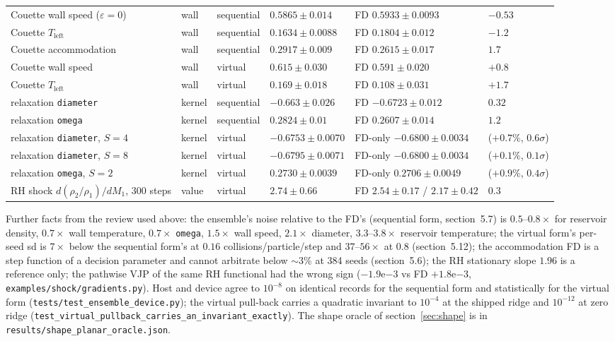 \documentclass[11pt,a4paper]{article}
\numberwithin{equation}{section}
\newcommand{\code}[1]{\texttt{#1}}
\begin{document}
\begin{center}
\begin{tabular}{llllll}
Couette wall speed ($\varepsilon{=}0$) & wall & sequential & $0.5865 \pm 0.014$ & FD $0.5933 \pm 0.0093$ & $-0.53$ \\
Couette $T_{\mathrm{left}}$ & wall & sequential & $0.1634 \pm 0.0088$ & FD $0.1804 \pm 0.012$ & $-1.2$ \\
Couette accommodation & wall & sequential & $0.2917 \pm 0.009$ & FD $0.2615 \pm 0.017$ & $1.7$ \\
Couette wall speed & wall & virtual & $0.615 \pm 0.030$ & FD $0.591 \pm 0.020$ & $+0.8$ \\
Couette $T_{\mathrm{left}}$ & wall & virtual & $0.169 \pm 0.018$ & FD $0.108 \pm 0.031$ & $+1.7$ \\
relaxation \code{diameter} & kernel & sequential & $-0.663 \pm 0.026$ & FD $-0.6723 \pm 0.012$ & $0.32$ \\
relaxation \code{omega} & kernel & sequential & $0.2824 \pm 0.01$ & FD $0.2607 \pm 0.014$ & $1.2$ \\
relaxation \code{diameter}, $S{=}4$ & kernel & virtual & $-0.6753 \pm 0.0070$ & FD-only $-0.6800 \pm 0.0034$ & ($+0.7\%$, $0.6\sigma$) \\
relaxation \code{diameter}, $S{=}8$ & kernel & virtual & $-0.6795 \pm 0.0071$ & FD-only $-0.6800 \pm 0.0034$ & ($+0.1\%$, $0.1\sigma$) \\
relaxation \code{omega}, $S{=}2$ & kernel & virtual & $0.2730 \pm 0.0039$ & FD-only $0.2706 \pm 0.0049$ & ($+0.9\%$, $0.4\sigma$) \\
RH shock $d(\rho_2/\rho_1)/dM_1$, 300 steps & value & virtual & $2.74 \pm 0.66$ & FD $2.54 \pm 0.17$ / $2.17 \pm 0.42$ & $0.3$ \\
\hline
\end{tabular}
\end{center}

\noindent
Further facts from the review used above: the ensemble's noise relative to the FD's
(sequential form, section~5.7) is $0.5$--$0.8\times$ for reservoir density, $0.7\times$ wall
temperature, $0.7\times$ \code{omega}, $1.5\times$ wall speed, $2.1\times$ diameter,
$3.3$--$3.8\times$ reservoir temperature; the virtual form's per-seed sd is $7\times$ below the
sequential form's at $0.16$ collisions/particle/step and $37$--$56\times$ at $0.8$
(section~5.12); the accommodation FD is a step function of a decision parameter and
cannot arbitrate below $\sim 3\%$ at 384 seeds (section~5.6); the RH stationary slope
$1.96$ is a reference only; the pathwise VJP of the same RH functional had the wrong
sign ($-1.9\mathrm{e}{-3}$ vs FD $+1.8\mathrm{e}{-3}$, \code{examples/shock/gradients.py}).
Host and device agree to $10^{-8}$ on identical records for the sequential form and
statistically for the virtual form (\code{tests/test\_ensemble\_device.py}); the
virtual pull-back carries a quadratic invariant to $10^{-4}$ at the shipped ridge and
$10^{-12}$ at zero ridge (\code{test\_virtual\_pullback\_carries\_an\_invariant\_exactly}).
The shape oracle of section~\ref{sec:shape} is in \code{results/shape\_planar\_oracle.json}.
\end{document}
